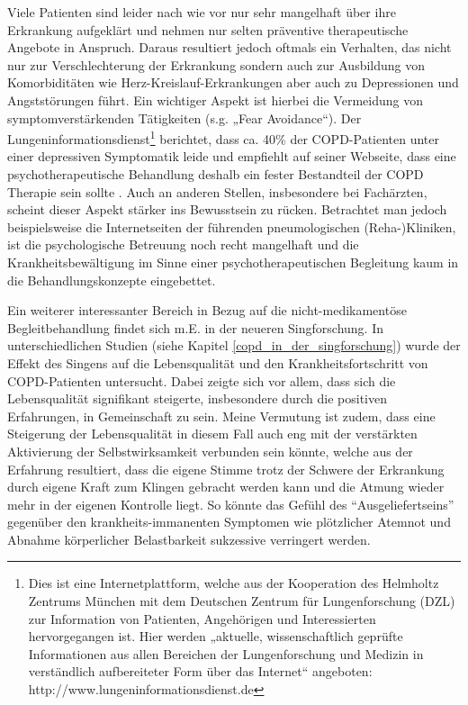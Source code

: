 Viele Patienten sind leider nach wie vor nur sehr mangelhaft über ihre Erkrankung aufgeklärt und nehmen nur selten präventive therapeutische Angebote in Anspruch. Daraus resultiert jedoch oftmals ein Verhalten, das nicht nur zur Verschlechterung der Erkrankung sondern auch zur Ausbildung von Komorbiditäten wie Herz-Kreislauf-Erkrankungen aber auch zu Depressionen und Angststörungen führt. Ein wichtiger Aspekt ist hierbei die Vermeidung von symptomverstärkenden Tätigkeiten (s.g. „Fear Avoidance“). Der Lungeninformationsdienst\footnote{Dies ist eine Internetplattform, welche aus der Kooperation des  Helmholtz Zentrums München mit dem Deutschen Zentrum für Lungenforschung (DZL) zur Information von Patienten, Angehörigen und Interessierten hervorgegangen ist. Hier werden „aktuelle, wissenschaftlich geprüfte Informationen aus allen Bereichen der Lungenforschung und Medizin in verständlich aufbereiteter Form über das Internet“ angeboten: http://www.lungeninformationsdienst.de} berichtet, dass ca. 40\% der COPD-Patienten unter einer depressiven Symptomatik leide und empfiehlt auf seiner Webseite, dass eine psychotherapeutische Behandlung deshalb ein fester Bestandteil der COPD Therapie sein sollte \autocite[vgl.][]{lungeninformationsdienst2011}. Auch an anderen Stellen, insbesondere bei Fachärzten, scheint dieser Aspekt stärker ins Bewusstsein zu rücken. Betrachtet man jedoch beispielsweise die Internetseiten der führenden pneumologischen (Reha-)Kliniken, ist die psychologische Betreuung noch recht mangelhaft und die Krankheitsbewältigung im Sinne einer psychotherapeutischen Begleitung kaum in die Behandlungskonzepte eingebettet. 

Ein weiterer interessanter Bereich in Bezug auf die nicht-medikamentöse Begleitbehandlung findet sich m.E. in der neueren Singforschung. In unterschiedlichen Studien (siehe Kapitel \ref{copd_in_der_singforschung}) wurde der Effekt des Singens auf die Lebensqualität und den Krankheitsfortschritt von COPD-Patienten untersucht. Dabei zeigte sich vor allem, dass sich die Lebensqualität signifikant steigerte, insbesondere durch die positiven Erfahrungen, in Gemeinschaft zu sein. Meine Vermutung ist zudem, dass eine Steigerung der Lebensqualität in diesem Fall auch eng mit der verstärkten Aktivierung der Selbstwirksamkeit verbunden sein könnte, welche aus der Erfahrung resultiert, dass die eigene Stimme trotz der Schwere der Erkrankung durch eigene Kraft zum Klingen gebracht werden kann und die Atmung wieder mehr in der eigenen Kontrolle liegt. So könnte das Gefühl des "`Ausgeliefertseins"' gegenüber den krankheits-immanenten Symptomen wie plötzlicher Atemnot und Abnahme körperlicher Belastbarkeit  sukzessive verringert werden.


